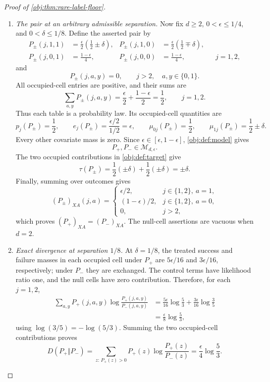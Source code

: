 \begin{proof}[Proof of \cref{obj:thm:rare-label-floor}]
\begin{enumerate}
\item \textit{The pair at an arbitrary admissible separation.}
Now fix \(d\ge2\), \(0<\epsilon\le1/4\), and \(0<\delta\le1/8\).
Define the asserted pair by
\[
\begin{aligned}
P_\pm(j,1,1)&=\frac{\epsilon}{2}\left(\frac12\pm\delta\right),&
P_\pm(j,1,0)&=\frac{\epsilon}{2}\left(\frac12\mp\delta\right),\\
P_\pm(j,0,1)&=\frac{1-\epsilon}{4},&
P_\pm(j,0,0)&=\frac{1-\epsilon}{4},
&&j=1,2,
\end{aligned}
\]
and
\[
P_\pm(j,a,y)=0,
\qquad j>2,\quad a,y\in\{0,1\}.
\]
All occupied-cell entries are positive, and their sums are
\[
\sum_{a,y}P_\pm(j,a,y)
=
\frac{\epsilon}{2}+\frac{1-\epsilon}{2}
=\frac12,
\qquad j=1,2.
\]
Thus each table is a probability law. Its occupied-cell quantities are
\[
p_j(P_\pm)=\frac12,
\qquad
e_j(P_\pm)=\frac{\epsilon/2}{1/2}=\epsilon,
\qquad
\mu_{0j}(P_\pm)=\frac12,
\qquad
\mu_{1j}(P_\pm)=\frac12\pm\delta.
\]
Every other covariate mass is zero. Since
\(\epsilon\in[\epsilon,1-\epsilon]\), \cref{obj:def:model} gives
\[
P_+,P_-\in\mathcal M_{d,\epsilon}.
\]
The two occupied contributions in \cref{obj:def:target} give
\[
\tau(P_\pm)
=
\frac12(\pm\delta)+\frac12(\pm\delta)
=\pm\delta.
\]
Finally, summing over outcomes gives
\[
(P_\pm)_{XA}(j,a)=
\begin{cases}
\epsilon/2,&j\in\{1,2\},\ a=1,\\
(1-\epsilon)/2,&j\in\{1,2\},\ a=0,\\
0,&j>2,
\end{cases}
\]
which proves \((P_+)_{XA}=(P_-)_{XA}\). The null-cell assertions are
vacuous when \(d=2\).

\item \textit{Exact divergence at separation \(1/8\).}
At \(\delta=1/8\), the treated success and failure masses in each
occupied cell under \(P_+\) are \(5\epsilon/16\) and
\(3\epsilon/16\), respectively; under \(P_-\) they are exchanged.
The control terms have likelihood ratio one, and the null cells have
zero contribution. Therefore, for each \(j=1,2\),
\[
\begin{aligned}
\sum_{a,y}
P_+(j,a,y)\log\frac{P_+(j,a,y)}{P_-(j,a,y)}
&=
\frac{5\epsilon}{16}\log\frac53
+
\frac{3\epsilon}{16}\log\frac35\\
&=
\frac{\epsilon}{8}\log\frac53,
\end{aligned}
\]
using \(\log(3/5)=-\log(5/3)\). Summing the two occupied-cell
contributions proves
\[
D(P_+\Vert P_-)
=
\sum_{z:\,P_+(z)>0}
P_+(z)\log\frac{P_+(z)}{P_-(z)}
=
\frac{\epsilon}{4}\log\frac53.
\]
\end{enumerate}
\end{proof}

